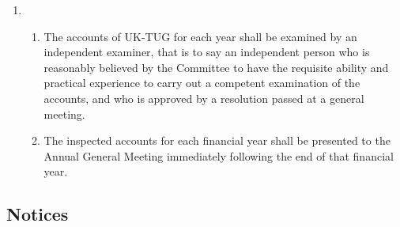 \documentclass[a4paper,11pt]{article}
\begin{document}
\begin{enumerate}
\item 
  \begin{enumerate}
  \item The accounts of UK-TUG for each year shall be examined by an
    independent examiner, that is to say an independent person who is
    reasonably believed by the Committee to have the requisite ability and
    practical experience to carry out a competent examination of the accounts,
    and who is approved by a resolution passed at a general
    meeting.

  \item The inspected accounts for each financial year shall be presented to the
    Annual General Meeting immediately following the end of that financial
    year.
  \end{enumerate}
\end{enumerate}

\subsection{Notices}
\end{document}
